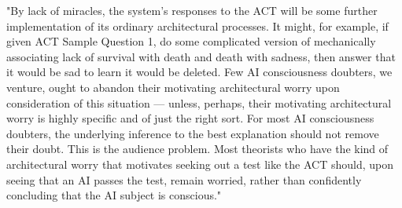 \documentclass{article}
\begin{document}
"By lack of miracles, the system’s responses to the ACT will be some further implementation of its ordinary architectural processes.  It might, for example, if given ACT Sample Question 1, do some complicated version of mechanically associating lack of survival with death and death with sadness, then answer that it would be sad to learn it would be deleted.  Few AI consciousness doubters, we venture, ought to abandon their motivating architectural worry upon consideration of this situation — unless, perhaps, their motivating architectural worry is highly specific and of just the right sort.  For most AI consciousness doubters, the underlying inference to the best explanation should not remove their doubt.  This is the audience problem.  Most theorists who have the kind of architectural worry that motivates seeking out a test like the ACT should, upon seeing that an AI passes the test, remain worried, rather than confidently concluding that the AI subject is conscious."
\end{document}

